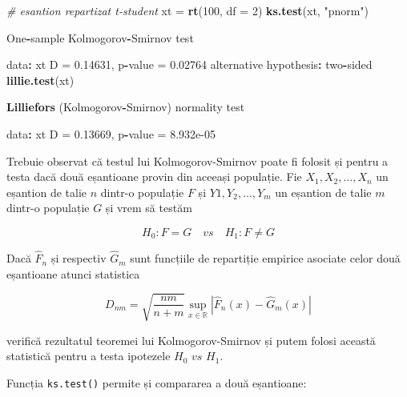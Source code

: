 \documentclass[]{article}
\newenvironment{Shaded}{\begin{snugshade}}{\end{snugshade}}
\newcommand{\KeywordTok}[1]{\textcolor[rgb]{0.13,0.29,0.53}{\textbf{#1}}}
\newcommand{\DataTypeTok}[1]{\textcolor[rgb]{0.13,0.29,0.53}{#1}}
\newcommand{\DecValTok}[1]{\textcolor[rgb]{0.00,0.00,0.81}{#1}}
\newcommand{\FloatTok}[1]{\textcolor[rgb]{0.00,0.00,0.81}{#1}}
\newcommand{\StringTok}[1]{\textcolor[rgb]{0.31,0.60,0.02}{#1}}
\newcommand{\CommentTok}[1]{\textcolor[rgb]{0.56,0.35,0.01}{\textit{#1}}}
\newcommand{\OperatorTok}[1]{\textcolor[rgb]{0.81,0.36,0.00}{\textbf{#1}}}
\newcommand{\NormalTok}[1]{#1}
\begin{document}
\begin{Shaded}
\begin{Highlighting}[]
\CommentTok{# esantion repartizat t-student}
\NormalTok{xt =}\StringTok{ }\KeywordTok{rt}\NormalTok{(}\DecValTok{100}\NormalTok{, }\DataTypeTok{df =} \DecValTok{2}\NormalTok{)}
\KeywordTok{ks.test}\NormalTok{(xt, }\StringTok{"pnorm"}\NormalTok{)}

\NormalTok{    One}\OperatorTok{-}\NormalTok{sample Kolmogorov}\OperatorTok{-}\NormalTok{Smirnov test}

\NormalTok{data}\OperatorTok{:}\StringTok{  }\NormalTok{xt}
\NormalTok{D =}\StringTok{ }\FloatTok{0.14631}\NormalTok{, p}\OperatorTok{-}\NormalTok{value =}\StringTok{ }\FloatTok{0.02764}
\NormalTok{alternative hypothesis}\OperatorTok{:}\StringTok{ }\NormalTok{two}\OperatorTok{-}\NormalTok{sided}
\KeywordTok{lillie.test}\NormalTok{(xt)}

    \KeywordTok{Lilliefors}\NormalTok{ (Kolmogorov}\OperatorTok{-}\NormalTok{Smirnov) normality test}

\NormalTok{data}\OperatorTok{:}\StringTok{  }\NormalTok{xt}
\NormalTok{D =}\StringTok{ }\FloatTok{0.13669}\NormalTok{, p}\OperatorTok{-}\NormalTok{value =}\StringTok{ }\FloatTok{8.932e-05}
\end{Highlighting}
\end{Shaded}

Trebuie observat că testul lui Kolmogorov-Smirnov poate fi folosit și
pentru a testa dacă două eșantioane provin din aceeași populație. Fie
\(X_1, X_2, \ldots, X_n\) un eșantion de talie \(n\) dintr-o populație
\(F\) și \(Y1, Y_2, \ldots, Y_m\) un eșantion de talie \(m\) dintr-o
populație \(G\) și vrem să testăm

\[
  H_0: F = G \quad vs\quad H_1: F\neq G
\]

Dacă \(\hat{F}_n\) și respectiv \(\hat{G}_m\) sunt funcțiile de
repartiție empirice asociate celor două eșantioane atunci statistica

\[
  D_{nm} = \sqrt{\frac{nm}{n+m}}\sup_{x\in\mathbb{R}}\left|\hat{F}_n(x) - \hat{G}_m(x)\right|
\]

verifică rezultatul teoremei lui Kolmogorov-Smirnov și putem folosi
această statistică pentru a testa ipotezele \(H_0\,\, vs\,\, H_1\).

Funcția \texttt{ks.test()} permite și compararea a două eșantioane:
\end{document}
